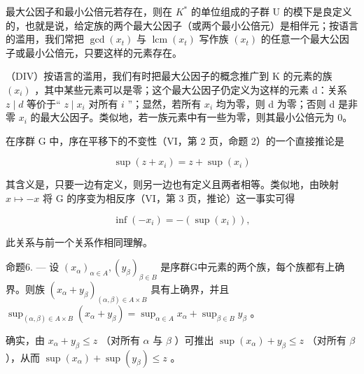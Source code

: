 最大公因子和最小公倍元若存在，则在 \(K^{*}\) 的单位组成的子群 U 的模下是良定义的，也就是说，给定族的两个最大公因子（或两个最小公倍元）是相伴元；按语言的滥用，我们常把 \(\gcd(x_{t})\) 与 \(\operatorname{lcm}(x_{t})\) 写作族 \((x_{t})\) 的任意一个最大公因子或最小公倍元，只要这样的元素存在。

（DIV）按语言的滥用，我们有时把最大公因子的概念推广到 K 的元素的族 \((x_{i})\) ，其中某些元素可以是零；这个最大公因子仍定义为这样的元素 d：关系 \(z \mid d\) 等价于“ \(z \mid x_{i}\) 对所有 \(i\) ”；显然，若所有 \(x_{i}\) 均为零，则 d 为零；否则 d 是非零 \(x_{i}\) 的最大公因子。类似地，若一族元素中有一些为零，则其最小公倍元为 0。

在序群 G 中，序在平移下的不变性（VI，第 2 页，命题 2）的一个直接推论是

\[
\sup \left(z + x _ {i}\right) = z + \sup \left(x _ {i}\right)\tag{1}
\]

其含义是，只要一边有定义，则另一边也有定义且两者相等。类似地，由映射 \(x \mapsto -x\) 将 G 的序变为相反序（VI，第 3 页，推论）这一事实可得

\[
\inf (- x _ {i}) = - (\sup (x _ {i})),\tag{2}
\]

此关系与前一个关系作相同理解。

命题6. --- 设 \((x_{\alpha})_{\alpha \in A}, (y_{\beta})_{\beta \in B}\) 是序群G中元素的两个族，每个族都有上确界。则族 \((x_{\alpha} + y_{\beta})_{(\alpha, \beta) \in A \times B}\) 具有上确界，并且 \(\sup_{(\alpha, \beta) \in A \times B} (x_{\alpha} + y_{\beta}) = \sup_{\alpha \in A} x_{\alpha} + \sup_{\beta \in B} y_{\beta}\) 。

确实，由 \(x_{\alpha} + y_{\beta} \leqslant z\) （对所有 \(\alpha\) 与 \(\beta\) ）可推出 \(\sup (x_{\alpha}) + y_{\beta} \leqslant z\) （对所有 \(\beta\) ），从而 \(\sup (x_{\alpha}) + \sup (y_{\beta}) \leqslant z\) 。

